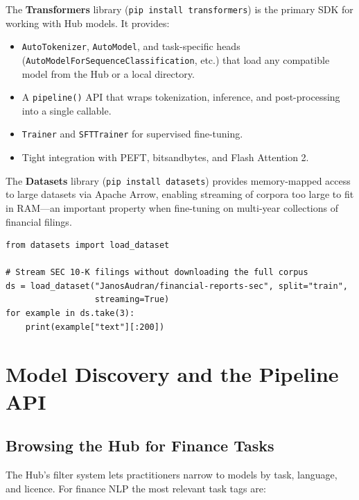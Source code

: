 The \textbf{Transformers} library (\texttt{pip install transformers}) is the
primary SDK for working with Hub models.  It provides:

\begin{itemize}
  \item \texttt{AutoTokenizer}, \texttt{AutoModel}, and task-specific heads
        (\texttt{AutoModelForSequenceClassification}, etc.) that load any
        compatible model from the Hub or a local directory.
  \item A \texttt{pipeline()} API that wraps tokenization, inference, and
        post-processing into a single callable.
  \item \texttt{Trainer} and \texttt{SFTTrainer} for supervised fine-tuning.
  \item Tight integration with PEFT, bitsandbytes, and Flash Attention 2.
\end{itemize}

The \textbf{Datasets} library (\texttt{pip install datasets}) provides
memory-mapped access to large datasets via Apache Arrow, enabling streaming
of corpora too large to fit in RAM---an important property when fine-tuning
on multi-year collections of financial filings.

\begin{verbatim}
from datasets import load_dataset

# Stream SEC 10-K filings without downloading the full corpus
ds = load_dataset("JanosAudran/financial-reports-sec", split="train",
                  streaming=True)
for example in ds.take(3):
    print(example["text"][:200])
\end{verbatim}

\section{Model Discovery and the Pipeline API}
\label{app:hf:models}

\subsection{Browsing the Hub for Finance Tasks}
\label{app:hf:browsing}

The Hub's filter system lets practitioners narrow to models by task, language,
and licence.  For finance NLP the most relevant task tags are:

